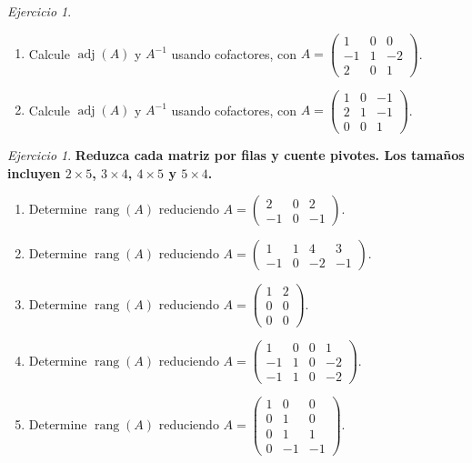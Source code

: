 \documentclass[12pt]{article}
\theoremstyle{remark}
\newtheorem{Ejer}[definicion]{Ejercicio}
\newcommand{\rang}{\operatorname{rang}}
\newcommand{\adj}{\operatorname{adj}}
\begin{document}
\begin{Ejer}
\begin{enumerate}[resume=banco]
\item Calcule $\adj(A)$ y $A^{-1}$ usando cofactores, con $A=\begin{pmatrix}1&0&0\\-1&1&-2\\2&0&1\end{pmatrix}$.

\item Calcule $\adj(A)$ y $A^{-1}$ usando cofactores, con $A=\begin{pmatrix}1&0&-1\\2&1&-1\\0&0&1\end{pmatrix}$.

\end{enumerate}
\end{Ejer}

\begin{Ejer}

\textbf{Reduzca cada matriz por filas y cuente pivotes. Los tamaños incluyen $2\times5$, $3\times4$, $4\times5$ y $5\times4$.}
\begin{enumerate}[resume=banco]

\item Determine $\rang(A)$ reduciendo $A=\begin{pmatrix}2&0&2\\-1&0&-1\end{pmatrix}$.

\item Determine $\rang(A)$ reduciendo $A=\begin{pmatrix}1&1&4&3\\-1&0&-2&-1\end{pmatrix}$.

\item Determine $\rang(A)$ reduciendo $A=\begin{pmatrix}1&2\\0&0\\0&0\end{pmatrix}$.

\item Determine $\rang(A)$ reduciendo $A=\begin{pmatrix}1&0&0&1\\-1&1&0&-2\\-1&1&0&-2\end{pmatrix}$.

\item Determine $\rang(A)$ reduciendo $A=\begin{pmatrix}1&0&0\\0&1&0\\0&1&1\\0&-1&-1\end{pmatrix}$.


\end{enumerate}
\end{Ejer}
\end{document}
